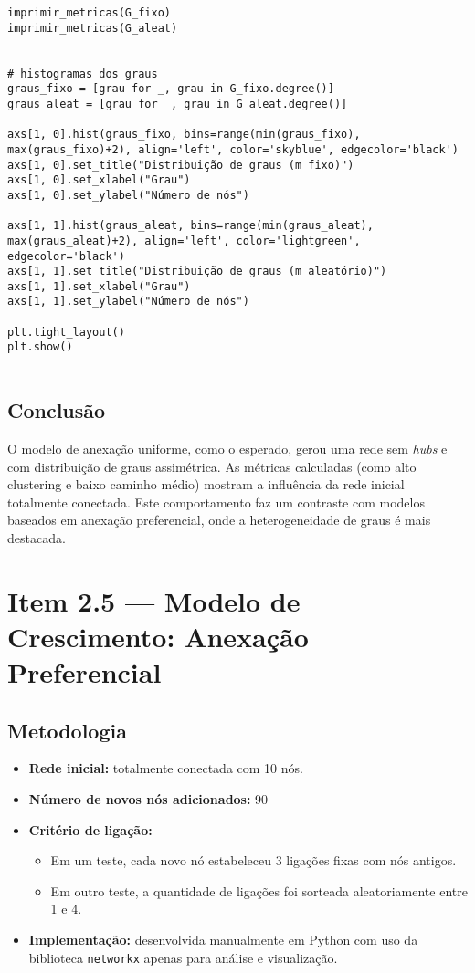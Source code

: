 \documentclass[a4paper]{article}
\begin{document}
\begin{verbatim}
imprimir_metricas(G_fixo)
imprimir_metricas(G_aleat)


# histogramas dos graus
graus_fixo = [grau for _, grau in G_fixo.degree()]
graus_aleat = [grau for _, grau in G_aleat.degree()]

axs[1, 0].hist(graus_fixo, bins=range(min(graus_fixo), max(graus_fixo)+2), align='left', color='skyblue', edgecolor='black')
axs[1, 0].set_title("Distribuição de graus (m fixo)")
axs[1, 0].set_xlabel("Grau")
axs[1, 0].set_ylabel("Número de nós")

axs[1, 1].hist(graus_aleat, bins=range(min(graus_aleat), max(graus_aleat)+2), align='left', color='lightgreen', edgecolor='black')
axs[1, 1].set_title("Distribuição de graus (m aleatório)")
axs[1, 1].set_xlabel("Grau")
axs[1, 1].set_ylabel("Número de nós")

plt.tight_layout()
plt.show()


\end{verbatim}

\subsection*{Conclusão}
O modelo de anexação uniforme, como o esperado, gerou uma rede sem \textit{hubs} e com distribuição de graus assimétrica. As métricas calculadas (como alto clustering e baixo caminho médio) mostram a influência da rede inicial totalmente conectada. Este comportamento faz um contraste com modelos baseados em anexação preferencial, onde a heterogeneidade de graus é mais destacada.

\newpage

\section*{Item 2.5 — Modelo de Crescimento: Anexação Preferencial}

\subsection*{Metodologia}

\begin{itemize}
    \item \textbf{Rede inicial:} totalmente conectada com 10 nós.
    \item \textbf{Número de novos nós adicionados:} 90
    \item \textbf{Critério de ligação:}
    \begin{itemize}
        \item Em um teste, cada novo nó estabeleceu 3 ligações fixas com nós antigos.
        \item Em outro teste, a quantidade de ligações foi sorteada aleatoriamente entre 1 e 4.
    \end{itemize}
    \item \textbf{Implementação:} desenvolvida manualmente em Python com uso da biblioteca \texttt{networkx} apenas para análise e visualização.
\end{itemize}
\end{document}
